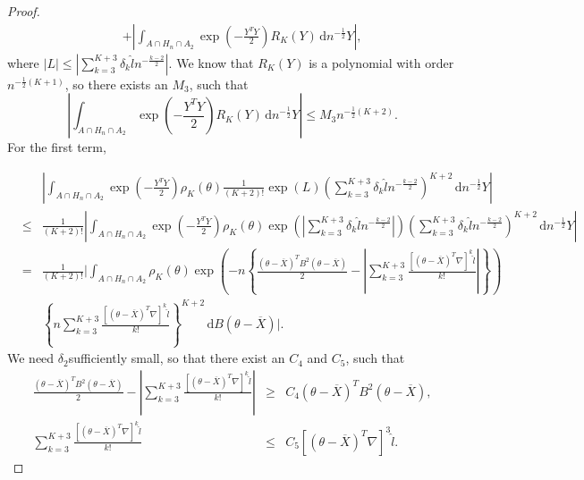 \documentclass[oneside,english]{amsbook}
\numberwithin{section}{chapter}
\numberwithin{equation}{section}
\numberwithin{figure}{section}
\theoremstyle{plain}
\theoremstyle{plain}
\theoremstyle{definition}
\theoremstyle{plain}
\theoremstyle{plain}
\theoremstyle{remark}
\theoremstyle{definition}
\theoremstyle{definition}
\newcommand{\diff}{\,\mathrm{d}}
\begin{document}
\begin{proof}
\begin{eqnarray*}
 &  & +\left|\int_{A\cap H_{n}\cap A_{2}}\exp\left(-\frac{Y^{T}Y}{2}\right)R_{K}\left(Y\right)\diff n^{-\frac{1}{2}}Y\right|,
\end{eqnarray*}
where $\left|L\right|\le\left|\sum_{k=3}^{K+3}\delta_{k}\hat{l}n^{-\frac{k-2}{2}}\right|$.
We know that $R_{K}\left(Y\right)$ is a polynomial with order $n^{-\frac{1}{2}\left(K+1\right)}$,
so there exists an $M_{3}$, such that 
\[
\left|\int_{A\cap H_{n}\cap A_{2}}\exp\left(-\frac{Y^{T}Y}{2}\right)R_{K}\left(Y\right)\diff n^{-\frac{1}{2}}Y\right|\le M_{3}n^{-\frac{1}{2}\left(K+2\right)}.
\]
For the first term, 

\begin{eqnarray}
 &  & \left|\int_{A\cap H_{n}\cap A_{2}}\exp\left(-\frac{Y^{T}Y}{2}\right)\rho_{K}\left(\theta\right)\frac{1}{\left(K+2\right)!}\exp\left(L\right)\left(\sum_{k=3}^{K+3}\delta_{k}\hat{l}n^{-\frac{k-2}{2}}\right)^{K+2}\diff n^{-\frac{1}{2}}Y\right|\label{eq:1}\\
 & \le & \frac{1}{\left(K+2\right)!}\left|\int_{A\cap H_{n}\cap A_{2}}\exp\left(-\frac{Y^{T}Y}{2}\right)\rho_{K}\left(\theta\right)\exp\left(\left|\sum_{k=3}^{K+3}\delta_{k}\hat{l}n^{-\frac{k-2}{2}}\right|\right)\left(\sum_{k=3}^{K+3}\delta_{k}\hat{l}n^{-\frac{k-2}{2}}\right)^{K+2}\diff n^{-\frac{1}{2}}Y\right|\nonumber \\
 & = & \frac{1}{\left(K+2\right)!}\Bigg|\int_{A\cap H_{n}\cap A_{2}}\rho_{K}\left(\theta\right)\exp\left(-n\left\{ \frac{\left(\theta-\overline{X}\right)^{T}B^{2}\left(\theta-\overline{X}\right)}{2}-\left|\sum_{k=3}^{K+3}\frac{\left[\left(\theta-\overline{X}\right)^{T}\nabla\right]^{k}\hat{l}}{k!}\right|\right\} \right)\nonumber \\
 &  & \left\{ n\sum_{k=3}^{K+3}\frac{\left[\left(\theta-\overline{X}\right)^{T}\nabla\right]^{k}\hat{l}}{k!}\right\} ^{K+2}\diff B\left(\theta-\overline{X}\right)\Bigg|.\nonumber 
\end{eqnarray}
We need $\delta_{2}$sufficiently small, so that there exist an $C_{4}$
and $C_{5}$, such that 
\begin{eqnarray*}
\frac{\left(\theta-\overline{X}\right)^{T}B^{2}\left(\theta-\overline{X}\right)}{2}-\left|\sum_{k=3}^{K+3}\frac{\left[\left(\theta-\overline{X}\right)^{T}\nabla\right]^{k}\hat{l}}{k!}\right| & \ge & C_{4}\left(\theta-\overline{X}\right)^{T}B^{2}\left(\theta-\overline{X}\right),\\
\sum_{k=3}^{K+3}\frac{\left[\left(\theta-\overline{X}\right)^{T}\nabla\right]^{k}\hat{l}}{k!} & \le & C_{5}\left[\left(\theta-\overline{X}\right)^{T}\nabla\right]^{3}\hat{l}.

\end{eqnarray*}
\end{proof}
\end{document}
